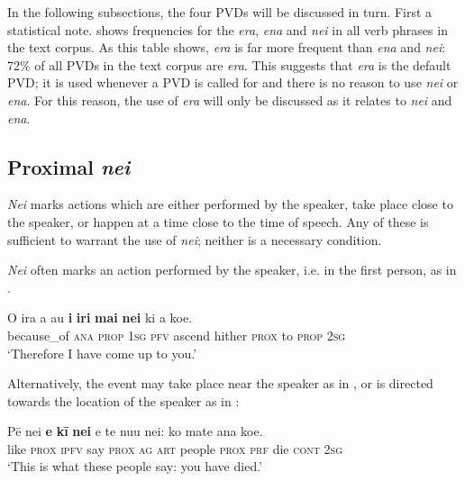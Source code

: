 In the following subsections, the four PVDs will be discussed in turn. First a statistical note.  shows frequencies for the \textit{era}, \textit{ena} and \textit{nei} in all verb phrases in the text corpus. As this table shows, \textit{era} is far more frequent than \textit{ena} and \textit{nei}: 72\% of all PVDs in the text corpus are \textit{era}. This suggests that \textit{era} is the default PVD; it is used whenever a PVD is called for and there is no reason to use \textit{nei} or \textit{ena}. For this reason, the use of \textit{era} will only be discussed as it relates to \textit{nei} and \textit{ena}.

\subsection{Proximal \textit{nei}} \label{sec:7.6.2}
\textit{Nei} marks actions which are either performed by the speaker, take place close to the speaker, or happen at a time close to the time of speech. Any of these is sufficient to warrant the use of \textit{nei}; neither is a necessary condition.

\textit{Nei} often marks an action performed by the speaker, i.e. in the first person, as in .

\ea\label{ex:7.154}
\gll {\ꞌ}O ira a au \textbf{i} \textbf{iri} \textbf{mai} \textbf{nei} ki a koe.\\
because\_of \textsc{ana} \textsc{prop} \textsc{1sg} \textsc{pfv} ascend hither \textsc{prox} to \textsc{prop} \textsc{2sg}\\

\glt
‘Therefore I have come up to you.’ \textstyleExampleref{[R229.208]} 
\z

Alternatively, the event may take place near the speaker as in , or is directed towards the location of the speaker as in :

\ea\label{ex:7.155}
\gll Pē nei \textbf{e} \textbf{kī} \textbf{nei} e te nu{\ꞌ}u nei: ko mate {\ꞌ}ana koe. \\
like \textsc{prox} \textsc{ipfv} say \textsc{prox} \textsc{ag} \textsc{art} people \textsc{prox} \textsc{prf} die \textsc{cont} \textsc{2sg} \\

\glt 
‘This is what these people say: you have died.’ \textstyleExampleref{[R229.316]} 
\z

